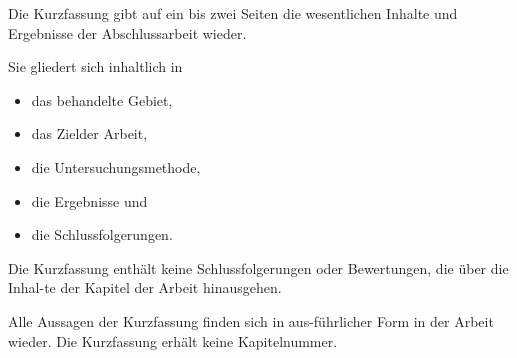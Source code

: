 Die Kurzfassung gibt auf ein bis zwei Seiten die wesentlichen Inhalte
und Ergebnisse der Abschlussarbeit wieder.

Sie gliedert sich inhaltlich in

\begin{itemize}
\tightlist
\item
  das behandelte Gebiet,
\item
  das Zielder Arbeit,
\item
  die Untersuchungsmethode,
\item
  die Ergebnisse und
\item
  die Schlussfolgerungen.
\end{itemize}

Die Kurzfassung enthält keine Schlussfolgerungen oder Bewertungen, die
über die Inhal-te der Kapitel der Arbeit hinausgehen.

Alle Aussagen der Kurzfassung finden sich in aus-führlicher Form in der
Arbeit wieder. Die Kurzfassung erhält keine Kapitelnummer.
